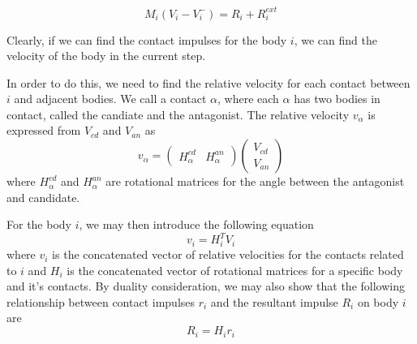 \documentclass[runningheads,a4paper]{llncs}
\begin{document}
\begin{equation}
  M_i(V_i - V_i^-) = R_i + R_i^{ext}
\end{equation}

Clearly, if we can find the contact impulses for the body $i$, we can find the
velocity of the body in the current step.

In order to do this, we need to find the relative velocity for each contact
between $i$ and adjacent bodies. We call a contact $\alpha$, where each
$\alpha$ has two bodies in contact, called the candiate and the antagonist. The
relative velocity $v_\alpha$ is expressed from $V_{cd}$ and $V_{an}$ as
\begin{equation}
  v_\alpha =
  \begin{pmatrix}
    H_\alpha^{cd} &
    H_\alpha^{an}
  \end{pmatrix}
  \begin{pmatrix}
    V_{cd} \\
    V_{an}
  \end{pmatrix}
\end{equation}
where $H_\alpha^{cd}$ and $H_\alpha^{an}$ are rotational matrices for the angle
between the antagonist and candidate.

For the body $i$, we may then introduce the following equation
\begin{equation}
  v_i = H_i^TV_i
\end{equation}
where $v_i$ is the concatenated vector of relative velocities for the contacts
related to $i$ and $H_i$ is the concatenated vector of rotational matrices for a
specific body and it's contacts. By duality consideration, we may also show that
the following relationship between contact impulses $r_i$ and the resultant
impulse $R_i$ on body $i$ are
\begin{equation}
R_i = H_i r_i
\end{equation}
\end{document}
